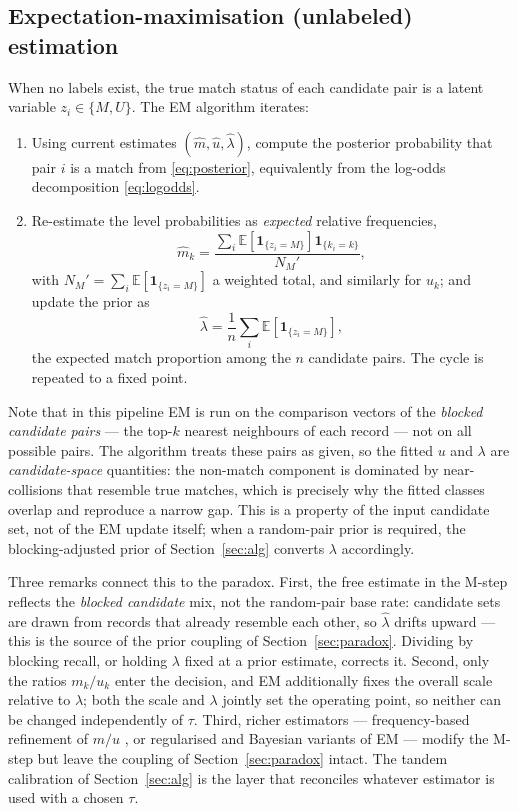 \documentclass[conference]{IEEEtran}
\begin{document}
\begin{appendices}
\subsection{Expectation-maximisation (unlabeled) estimation}
When no labels exist, the true match status of each candidate pair is a latent variable
$z_i\in\{M,U\}$. The EM algorithm iterates:
\begin{enumerate}
\item[\textbf{E-step.}] Using current estimates $(\hat m,\hat u,\hat\lambda)$, compute the
posterior probability that pair $i$ is a match from \eqref{eq:posterior}, equivalently from
the log-odds decomposition \eqref{eq:logodds}.
\item[\textbf{M-step.}] Re-estimate the level probabilities as \emph{expected} relative
frequencies,
\begin{equation}
\hat m_k=\frac{\sum_{i}\mathbb E[ \mathbf 1_{\{z_i=M\}}]\mathbf 1_{\{k_i=k\}}}{N_M'},
\end{equation}
with $N_M'=\sum_i \mathbb E[\mathbf 1_{\{z_i=M\}}]$ a weighted total, and similarly for
$u_k$; and update the prior as
\begin{equation}
\hat\lambda=\frac{1}{n}\sum_i\mathbb E[\mathbf 1_{\{z_i=M\}}],
\end{equation}
the expected match proportion among the $n$ candidate pairs. The cycle is repeated to a
fixed point.
\end{enumerate}

Note that in this pipeline EM is run on the comparison vectors of the \emph{blocked
candidate pairs} --- the top-$k$ nearest neighbours of each record --- not on all possible
pairs. The algorithm treats these pairs as given, so the fitted $u$ and $\lambda$ are
\emph{candidate-space} quantities: the non-match component is dominated by near-collisions
that resemble true matches, which is precisely why the fitted classes overlap and reproduce a
narrow gap. This is a property of the input candidate set, not of the EM update itself; when
a random-pair prior is required, the blocking-adjusted prior of Section~\ref{sec:alg}
converts $\lambda$ accordingly.

Three remarks connect this to the paradox. First, the free estimate in the M-step reflects
the \emph{blocked candidate} mix, not the random-pair base rate: candidate sets are drawn
from records that already resemble each other, so $\hat\lambda$ drifts upward --- this is the
source of the prior coupling of Section~\ref{sec:paradox}. Dividing by blocking recall, or
holding $\lambda$ fixed at a prior estimate, corrects it. Second, only the ratios $m_k/u_k$
enter the decision, and EM additionally fixes the overall scale relative to $\lambda$; both
the scale and $\lambda$ jointly set the operating point, so neither can be changed
independently of $\tau$. Third, richer estimators --- frequency-based refinement of $m/u$
\cite{winkler2000}, or regularised and Bayesian variants of EM \cite{mclachlan2000} ---
modify the M-step but leave the coupling of Section~\ref{sec:paradox} intact. The tandem
calibration of Section~\ref{sec:alg} is the layer that reconciles whatever estimator is used
with a chosen $\tau$.

\end{appendices}
\end{document}
